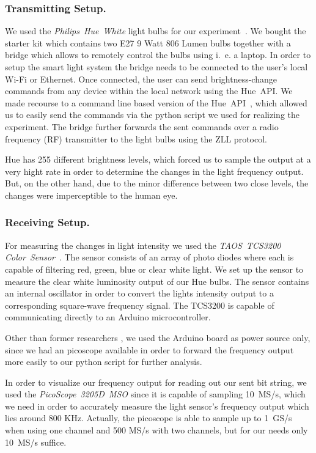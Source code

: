 \subsubsection{Transmitting Setup.} We used the \textit{Philips~Hue~White} light bulbs for our experiment~\cite{Philips:2018:Hue}. We bought the starter kit which contains two E27 9 Watt 806 Lumen bulbs together with a bridge which allows to remotely control the bulbs using i.~e. a laptop. In order to setup the smart light system the bridge needs to be connected to the user's local Wi-Fi or Ethernet. Once connected, the user can send brightness-change commands from any device within the local network using the Hue~API. We made recourse to a command line based version of the Hue~API~\cite{Bahamas10:2018:HueApi}, which allowed us to easily send the commands via the python script we used for realizing the experiment. The bridge further forwards the sent commands over a radio frequency (RF) transmitter to the light bulbs using the ZLL protocol.

Hue has 255 different brightness levels, which forced us to sample the output at a very hight rate in order to determine the changes in the light frequency output. But, on the other hand, due to the minor difference between two close levels, the changes were imperceptible to the human eye.

\subsubsection{Receiving Setup.} For measuring the changes in light intensity we used the \textit{TAOS~TCS3200 Color~Sensor}~\cite{DFRobot:2018:Sensor}. The sensor consists of an array of photo diodes where each is capable of filtering red, green, blue or clear white light. We set up the sensor to measure the clear white luminosity output of our Hue bulbs. The sensor contains an internal oscillator in order to convert the lights intensity output to a corresponding square-wave frequency signal. The TCS3200 is capable of communicating directly to an Arduino microcontroller.

Other than former researchers \cite{Ronen:2016:EFAIDCSL}, we used the Arduino board as power source only, since we had an picoscope available in order to forward the frequency output more easily to our python script for further analysis.

In order to visualize our frequency output for reading out our sent bit string, we used the \textit{PicoScope~3205D~MSO} since it is capable of sampling 10~MS/s, which we need in order to accurately measure the light sensor's frequency output which lies around 800 KHz. Actually, the picoscope is able to sample up to 1~GS/s when using one channel and 500 MS/s with two channels, but for our needs only 10~MS/s suffice.

